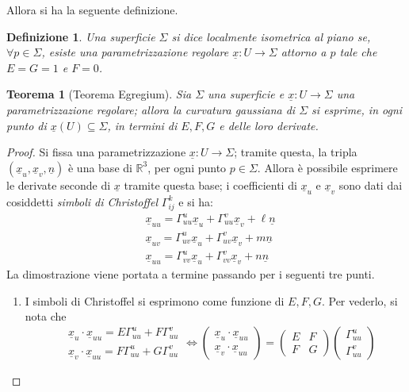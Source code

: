 \documentclass[12pt]{scrartcl}
\theoremstyle{style}
\newtheorem{definizione}{Definizione}[section]
\newtheorem{teorema}{Teorema}[section]
\numberwithin{equation}{subsection}
\begin{document}
Allora si ha la seguente definizione.
\begin{definizione}
	Una superficie $\Sigma$ si dice \textit{localmente isometrica} al piano se, $\forall p \in \Sigma$, esiste una parametrizzazione regolare $\underline{x}: U \to \Sigma$ attorno a $p$ tale che $E = G = 1 $ e $F=0$.
\end{definizione}
\begin{teorema}
	[Teorema Egregium]
	Sia $\Sigma$ una superficie e $\underline{x}: U \to \Sigma$ una parametrizzazione regolare; allora la curvatura gaussiana di $\Sigma$ si esprime, in ogni punto di $\underline{x}(U) \subseteq \Sigma$, in termini di $E,F,G$ e delle loro derivate.
\end{teorema}
	\begin{proof}
		Si fissa una parametrizzazione $\underline{x}:U\to \Sigma$; tramite questa, la tripla $(\underline{x}_u,\underline{x}_v, \underline{n})$ \`e una base di $\mathbb{R}^3$, per ogni punto $p \in \Sigma$.
		Allora \`e possibile esprimere le derivate seconde di $\underline{x}$ tramite questa base; i coefficienti di $\underline{x}_u$ e $\underline{x}_v$ sono dati dai cosiddetti \textit{simboli di Christoffel} $\Gamma_{ij} ^k$ e si ha:
		\[
			\begin{split}
		&\underline{x}_{uu} = \Gamma_{uu} ^u \underline{x}_u + \Gamma_{uu} ^v \underline{x}_v + \ell  \underline{n}\\
		&\underline{x}_{uv} = \Gamma_{uv} ^u \underline{x}_u + \Gamma_{uv} ^v \underline{x}_v + m \underline{n}\\
		&\underline{x}_{uu} = \Gamma_{vv} ^u \underline{x}_u + \Gamma_{vv} ^v \underline{x}_v + n  \underline{n}
			\end{split}
		\] 
		La dimostrazione viene portata a termine passando per i seguenti tre punti.
		\begin{enumerate}[(1).]
			\item I simboli di Christoffel si esprimono come funzione di $E,F,G$. 
				Per vederlo, si nota che
				\[
				\begin{split}
					&\underline{x}_u \cdot \underline{x}_{uu}  = E \Gamma^u _{uu} + F \Gamma_{uu} ^v\\
					&\underline{x}_v \cdot \underline{x}_{uu} = F \Gamma^u_{uu}  + G \Gamma_{uu} ^v
					\end{split}\iff\begin{pmatrix} \underline{x}_u \cdot \underline{x}_{uu}\\ \underline{x}_v \cdot \underline{x}_{uu}   \end{pmatrix} = \begin{pmatrix} E & F \\ F & G \end{pmatrix}  \begin{pmatrix} \Gamma^u_{uu} \\\Gamma^v_{uu}  \end{pmatrix} 
\]
\end{enumerate}
\end{proof}
\end{document}
